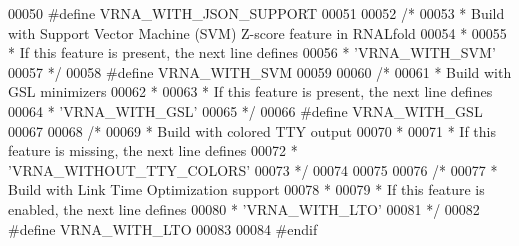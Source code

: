\begin{DoxyCode}
00050 \textcolor{preprocessor}{#define VRNA\_WITH\_JSON\_SUPPORT}
00051 
00052 \textcolor{comment}{/*}
00053 \textcolor{comment}{ * Build with Support Vector Machine (SVM) Z-score feature in RNALfold}
00054 \textcolor{comment}{ *}
00055 \textcolor{comment}{ * If this feature is present, the next line defines}
00056 \textcolor{comment}{ * 'VRNA\_WITH\_SVM'}
00057 \textcolor{comment}{ */}
00058 \textcolor{preprocessor}{#define VRNA\_WITH\_SVM}
00059 
00060 \textcolor{comment}{/*}
00061 \textcolor{comment}{ * Build with GSL minimizers}
00062 \textcolor{comment}{ *}
00063 \textcolor{comment}{ * If this feature is present, the next line defines}
00064 \textcolor{comment}{ * 'VRNA\_WITH\_GSL'}
00065 \textcolor{comment}{ */}
00066 \textcolor{preprocessor}{#define VRNA\_WITH\_GSL}
00067 
00068 \textcolor{comment}{/*}
00069 \textcolor{comment}{ * Build with colored TTY output}
00070 \textcolor{comment}{ *}
00071 \textcolor{comment}{ * If this feature is missing, the next line defines}
00072 \textcolor{comment}{ * 'VRNA\_WITHOUT\_TTY\_COLORS'}
00073 \textcolor{comment}{ */}
00074 
00075 
00076 \textcolor{comment}{/*}
00077 \textcolor{comment}{ * Build with Link Time Optimization support}
00078 \textcolor{comment}{ *}
00079 \textcolor{comment}{ * If this feature is enabled, the next line defines}
00080 \textcolor{comment}{ * 'VRNA\_WITH\_LTO'}
00081 \textcolor{comment}{ */}
00082 \textcolor{preprocessor}{#define VRNA\_WITH\_LTO}
00083 
00084 \textcolor{preprocessor}{#endif}
\end{DoxyCode}
